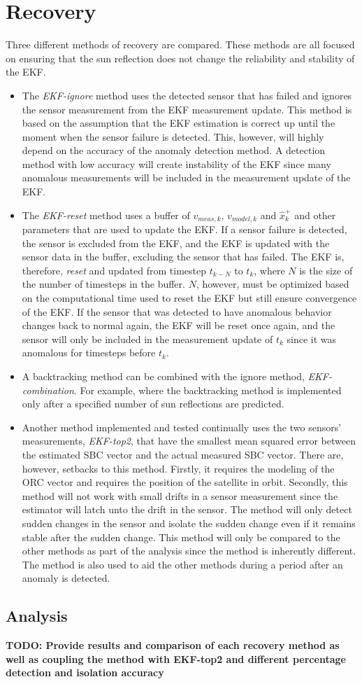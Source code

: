 \chapter{Recovery}
\label{chap:Recovery}

Three different methods of recovery are compared. These methods are all focused on ensuring that the sun reflection does not change the reliability and stability of the EKF.

\begin{itemize}
	\item The \emph{EKF-ignore} method uses the detected sensor that has failed and ignores the sensor measurement from the EKF measurement update. This method is based on the assumption that the EKF estimation is correct up until the moment when the sensor failure is detected. This, however, will highly depend on the accuracy of the anomaly detection method. A detection method with low accuracy will create instability of the EKF since many anomalous measurements will be included in the measurement update of the EKF.
	
	\item The \emph{EKF-reset} method uses a buffer of $v_{meas,k}$, $v_{model,k}$ and $\hat{x}_k^+$ and other parameters that are used to update the EKF. If a sensor failure is detected, the sensor is excluded from the EKF, and the EKF is updated with the sensor data in the buffer, excluding the sensor that has failed. The EKF is, therefore, \emph{reset} and updated from timestep $t_{k-N}$ to $t_k$, where $N$ is the size of the number of timesteps in the buffer. $N$, however, must be optimized based on the computational time used to reset the EKF but still ensure convergence of the EKF. If the sensor that was detected to have anomalous behavior changes back to normal again, the EKF will be reset once again, and the sensor will only be included in the measurement update of $t_k$ since it was anomalous for timesteps before $t_k$.
	
	\item A backtracking method can be combined with the ignore method, \emph{EKF-combination}. For example, where the backtracking method is implemented only after a specified number of sun reflections are predicted.
	
	\item Another method implemented and tested continually uses the two sensors' measurements, \emph{EKF-top2}, that have the smallest mean squared error between the estimated SBC vector and the actual measured SBC vector. There are, however, setbacks to this method. Firstly, it requires the modeling of the ORC vector and requires the position of the satellite in orbit. Secondly, this method will not work with small drifts in a sensor measurement since the estimator will latch unto the drift in the sensor. The method will only detect sudden changes in the sensor and isolate the sudden change even if it remains stable after the sudden change. This method will only be compared to the other methods as part of the analysis since the method is inherently different. The method is also used to aid the other methods during a period after an anomaly is detected.
\end{itemize}

\section{Analysis}
\textbf{TODO: Provide results and comparison of each recovery method as well as coupling the method with EKF-top2 and different percentage detection and isolation accuracy}